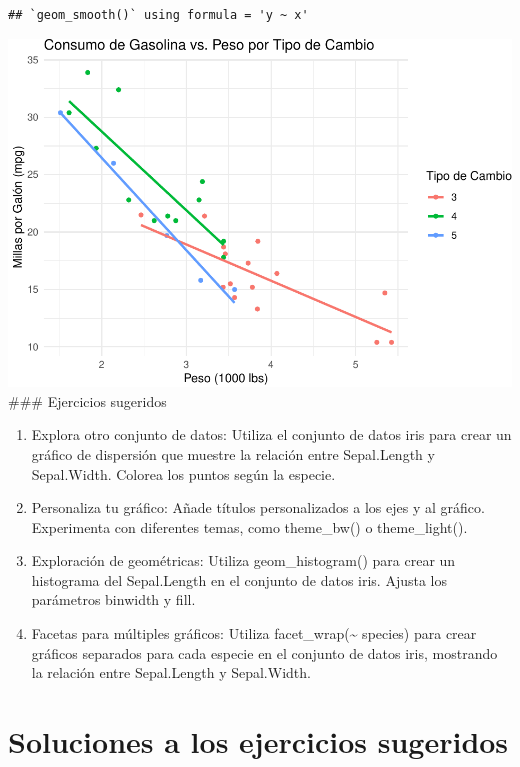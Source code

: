 \documentclass[
]{book}
\providecommand{\tightlist}{%
  \setlength{\itemsep}{0pt}\setlength{\parskip}{0pt}}
\begin{document}
\begin{verbatim}
## `geom_smooth()` using formula = 'y ~ x'
\end{verbatim}

\includegraphics{bookdown-demo_files/figure-latex/unnamed-chunk-194-1.pdf}
\#\#\# Ejercicios sugeridos

\begin{enumerate}
\def\labelenumi{\arabic{enumi}.}
\tightlist
\item
  Explora otro conjunto de datos: Utiliza el conjunto de datos iris para crear un gráfico de dispersión que muestre la relación entre Sepal.Length y Sepal.Width. Colorea los puntos según la especie.
\item
  Personaliza tu gráfico: Añade títulos personalizados a los ejes y al gráfico. Experimenta con diferentes temas, como theme\_bw() o theme\_light().
\item
  Exploración de geométricas: Utiliza geom\_histogram() para crear un histograma del Sepal.Length en el conjunto de datos iris. Ajusta los parámetros binwidth y fill.
\item
  Facetas para múltiples gráficos: Utiliza facet\_wrap(\textasciitilde{} species) para crear gráficos separados para cada especie en el conjunto de datos iris, mostrando la relación entre Sepal.Length y Sepal.Width.
\end{enumerate}

\hypertarget{soluciones-a-los-ejercicios-sugeridos-1}{%
\section{Soluciones a los ejercicios sugeridos}\label{soluciones-a-los-ejercicios-sugeridos-1}}
\end{document}
